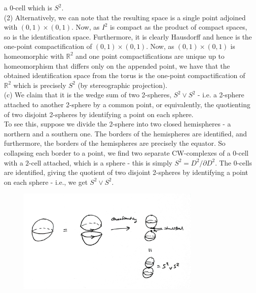 \documentclass[a4paper]{article}
\begin{document}
   a $0$-cell which is $S^{2}$.\\
   \linebreak
   (2) Alternatively, we can note that the resulting space is a single point
   adjoined with $(0,1) \times (0,1)$. Now, as $I^2$ is compact as the product
   of compact spaces, so is the identification space. Furthermore, it is
   clearly Hausdorff and hence is the one-point compactification of $(0,1)
   \times (0,1)$. Now, as $(0,1) \times (0,1)$ is homeomorphic with
   $\mathbb{R}^2$ and one point compactifications are unique up to
   homeomorphism that differs only on the appended point, we have that
   the obtained identification space from the torus is the one-point
   compactification of $\mathbb{R}^2$ which is precisely
   $S^2$ (by stereographic projection).\\
   \linebreak
   (c) We claim that it is the wedge sum of two 2-spheres, $S^{2} \vee S^{2}$
   - i.e. a 2-sphere attached to another 2-sphere by a common point, or
   equivalently, the quotienting of two disjoint 2-spheres by identifying
   a point on each sphere.\\
   \linebreak
   To see this, suppose we divide the 2-sphere into two closed hemispheres
   - a northern and a southern one. The borders of the hemispheres are
   identified, and furthermore, the borders of the hemispheres are precisely
   the equator. So collapsing each border to a point, we find two separate
   CW-complexes of a $0$-cell with a $2$-cell attached, which is a sphere
   - this is simply $S^{2} = D^{2} / \partial D^{2}$. The
   $0$-cells are identified, giving the quotient of two disjoint 2-spheres by
   identifying a point on each sphere - i.e., we get  $S^{2} \vee S^{2}$.


   \begin{figure}[H]
       \centering
       \includegraphics[width=0.8\textwidth]{3.jpeg}
       \label{fig:3-jpeg}
   \end{figure}
\end{document}
